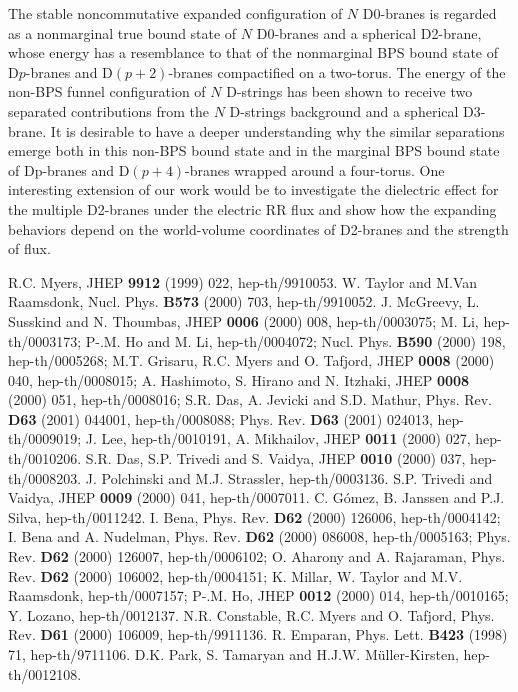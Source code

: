 \documentclass[12pt,a4paper]{article}
\begin{document}
The stable noncommutative expanded configuration of $N$ D0-branes
is regarded as a nonmarginal true bound state of $N$ D0-branes and a
spherical D2-brane, whose energy has a resemblance to that of the
nonmarginal BPS bound state of D$p$-branes and D$(p+2)$-branes 
compactified on a two-torus. The energy of the non-BPS funnel
configuration of $N$ D-strings has been shown to receive 
two separated contributions from the $N$ D-strings background and 
a spherical D3-brane. It is desirable to have a deeper understanding
why the similar separations emerge both in this non-BPS bound state
and in the marginal BPS bound state of Dp-branes and D$(p+4)$-branes
wrapped around a four-torus. 
One interesting extension of our work would be to investigate
the dielectric effect for the multiple D2-branes under the electric
RR flux and show how the expanding behaviors depend on the 
world-volume coordinates of D2-branes and  the strength of flux.

\begin{thebibliography}{99}
 R.C. Myers, JHEP \textbf{9912} (1999) 022, hep-th/9910053.
 W. Taylor and M.Van Raamsdonk, Nucl. Phys. \textbf{B573} 
(2000) 703, hep-th/9910052.
 J. McGreevy, L. Susskind and N. Thoumbas, JHEP \textbf{0006}
(2000) 008, hep-th/0003075; M. Li, hep-th/0003173; P-.M. Ho and M. Li, 
hep-th/0004072; Nucl. Phys. \textbf{B590} (2000) 198, hep-th/0005268;
 M.T. Grisaru, R.C. Myers and O. Tafjord, JHEP 
\textbf{0008} (2000) 040, hep-th/0008015; A. Hashimoto, S. Hirano and 
N. Itzhaki, JHEP \textbf{0008} (2000) 051, hep-th/0008016;
S.R. Das, A. Jevicki and S.D. Mathur, Phys. Rev. \textbf{D63} (2001) 
044001, hep-th/0008088; Phys. Rev. \textbf{D63} (2001) 024013,
 hep-th/0009019; J. Lee, hep-th/0010191, A. Mikhailov, JHEP
\textbf{0011} (2000) 027, hep-th/0010206.
 S.R. Das, S.P. Trivedi and S. Vaidya, JHEP \textbf{0010}
(2000) 037, hep-th/0008203.
 J. Polchinski and M.J. Strassler, hep-th/0003136.
 S.P. Trivedi and Vaidya, JHEP \textbf{0009} (2000) 041,
 hep-th/0007011.
 C. G\'omez, B. Janssen and P.J. Silva, hep-th/0011242.
 I. Bena, Phys. Rev. \textbf{D62} (2000) 126006, 
hep-th/0004142; I. Bena and A. Nudelman, Phys. Rev. \textbf{D62} (2000)
086008, hep-th/0005163; Phys. Rev. \textbf{D62} (2000) 126007, 
hep-th/0006102; O. Aharony and A. Rajaraman, Phys. Rev. \textbf{D62}
(2000) 106002, hep-th/0004151; K. Millar, W. Taylor and M.V. Raamsdonk,
hep-th/0007157; P-.M. Ho, JHEP \textbf{0012} (2000) 014, hep-th/0010165;
Y. Lozano, hep-th/0012137.
 N.R. Constable, R.C. Myers and O. Tafjord, Phys. Rev.
\textbf{D61} (2000) 106009, hep-th/9911136.
 R. Emparan, Phys. Lett. \textbf{B423} (1998) 71,
 hep-th/9711106.
 D.K. Park, S. Tamaryan and H.J.W. M\"uller-Kirsten,
hep-th/0012108. 

\end{thebibliography}
\end{document}
